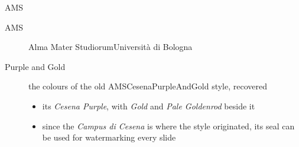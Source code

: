 \begin{frame}[c]{AMS}
%
\begin{description}
	\item[AMS] Alma Mater Studiorum\textendash{}Università di Bologna
	\item[Purple and Gold] the colours of the old \alert{AMSCesenaPurpleAndGold} style, recovered
	\begin{itemize}
		\item its \textcolor{pgpurple}{\textit{Cesena Purple}}, with \textcolor{pggolddark}{\textit{Gold}} and \textcolor{pggreymid}{\textit{Pale Goldenrod}} beside it
		\item since the \emph{Campus di Cesena} is where the style originated, its seal can be used for watermarking every slide
	\end{itemize}
\end{description}
%
\end{frame}
